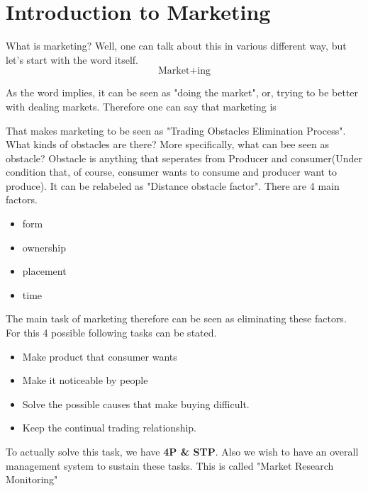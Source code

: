 \documentclass[12pt]{article}
\begin{document}
\maketitle

\section{Introduction to Marketing}

What is marketing? Well, one can talk about this in various different way, but let's start with the word itself.
$$ \text{Market}+\text{ing} $$

As the word implies, it can be seen as "doing the market", or, trying to be better with dealing markets. Therefore one can say that marketing is

\begin{tcolorbox}
\end{tcolorbox}

That makes marketing to be seen as "Trading Obstacles Elimination Process". What kinds of obstacles are there? More specifically, what can bee seen as obstacle? Obstacle is anything that seperates from Producer and consumer(Under condition that, of course, consumer wants to consume and producer want to produce). It can be relabeled as "Distance obstacle factor". There are 4 main factors.
\begin{itemize}
	\item form
	\item ownership
	\item placement
	\item time
\end{itemize}
The main task of marketing therefore can be seen as eliminating these factors. For this 4 possible following tasks can be stated.
\begin{itemize}
	\item Make product that consumer wants
	\item Make it noticeable by people
	\item Solve the possible causes that make buying difficult.
	\item Keep the continual trading relationship.
\end{itemize}
To actually solve this task, we have \textbf{4P \& STP}. Also we wish to have
an overall management system to sustain these tasks. This is called "Market Research Monitoring"


\end{document}
